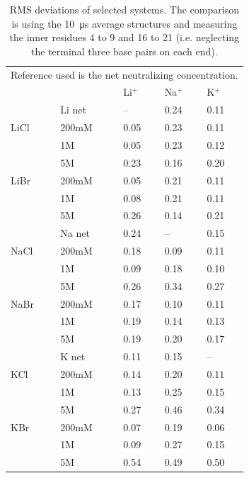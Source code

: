 \documentclass[9pt,lessons]{livecoms}
\begin{document}
\begin{table}[]
\caption{RMS deviations of selected systems.  The comparison is using the \SI{10}{\micro\second} average structures and measuring the inner residues 4 to 9 and 16 to 21 (i.e. neglecting the terminal three base pairs on each end).}
\label{10us-rmsd-inner}
\begin{tabular}{lllll}
\multicolumn{5}{l}{Reference used is the net neutralizing concentration.} \\
             &                & Li$^{+}$      & Na$^{+}$    & K$^{+}$           \\
             & Li net         & --           & 0.24         & 0.11        \\
LiCl         & 200mM          & 0.05         & 0.23         & 0.11        \\
             & 1M             & 0.05         & 0.23         & 0.12        \\
             & 5M             & 0.23         & 0.16         & 0.20        \\
LiBr         & 200mM          & 0.05         & 0.21         & 0.11        \\
             & 1M             & 0.08         & 0.21         & 0.11        \\
             & 5M             & 0.26         & 0.14         & 0.21        \\
             & Na net         & 0.24         & --           & 0.15        \\
NaCl         & 200mM          & 0.18         & 0.09         & 0.11        \\
             & 1M             & 0.09         & 0.18         & 0.10        \\
             & 5M             & 0.26         & 0.34         & 0.27        \\
NaBr         & 200mM          & 0.17         & 0.10         & 0.11        \\
             & 1M             & 0.19         & 0.14         & 0.13        \\
             & 5M             & 0.19         & 0.20         & 0.17        \\
             & K net          & 0.11         & 0.15         & --          \\
KCl          & 200mM          & 0.14         & 0.20         & 0.11        \\
             & 1M             & 0.13         & 0.25         & 0.15        \\
             & 5M             & 0.27         & 0.46         & 0.34        \\
KBr          & 200mM          & 0.07         & 0.19         & 0.06        \\
             & 1M             & 0.09         & 0.27         & 0.15        \\
             & 5M             & 0.54         & 0.49         & 0.50       
\end{tabular}
\end{table}
\end{document}
